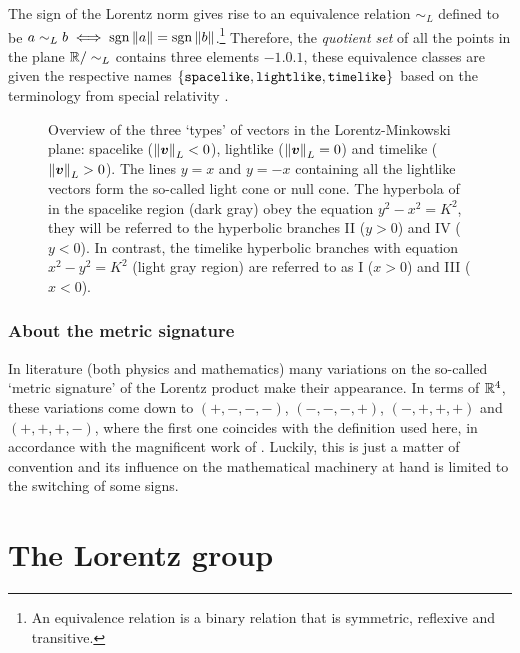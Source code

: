 The sign of the Lorentz norm gives rise to an equivalence relation \(\sim_L\) defined to be \(a \sim_L b \iff \operatorname{sgn}{\norm{a}} = \operatorname{sgn}{\norm{b}}\).\footnote{An equivalence relation is a binary relation that is symmetric, reflexive and transitive.} Therefore, the \emph{quotient set} of all the points in the plane \(\mathbb{R} / \sim_L \) contains three elements \(\qty{-1, 0, 1}\), these equivalence classes are given the respective names \(\qty{\text{\texttt{spacelike}}, \text{\texttt{lightlike}}, \text{\texttt{timelike}}}\) based on the terminology from special relativity \cite{Landau1971}.

\begin{figure}[ht]
    \centering
    
    \caption{Overview of the three `types' of vectors in the Lorentz-Minkowski plane: spacelike (\(\norm{\vb*{v}}_L < 0\)), lightlike (\(\norm{\vb*{v}}_L = 0\)) and timelike (\(\norm{\vb*{v}}_L > 0\)). The lines \(y = x\) and \(y = -x\) containing all the lightlike vectors form the so-called light cone or null cone. The hyperbola of in the spacelike region (dark gray) obey the equation \(y^2 - x^2 = K^2\), they will be referred to the hyperbolic branches II (\(y > 0\)) and IV (\(y < 0\)). In contrast, the timelike hyperbolic branches with equation \(x^2 - y^2 = K^2\) (light gray region) are referred to as I (\(x > 0\)) and III (\(x < 0\)).}
    \label{fig:lightlike_spacelike}
\end{figure}

\subsubsection{About the metric signature}
In literature (both physics and mathematics) many variations on the so-called `metric signature' of the Lorentz product make their appearance. In terms of \(\mathbb{R}^4\), these variations come down to \((+,-,-,-)\), \((-,-,-,+)\), \((-,+,+,+)\) and \((+,+,+,-)\), where the first one coincides with the definition used here, in accordance with the magnificent work of \citet{Landau1971}. Luckily, this is just a matter of convention and its influence on the mathematical machinery at hand is limited to the switching of some signs.

\section{The Lorentz group}



